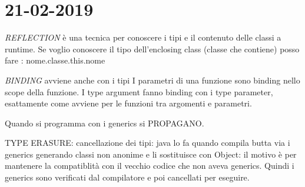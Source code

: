 

\newpage
\section{21-02-2019}
\par

\textit{REFLECTION} è una tecnica per conoscere i tipi e il contenuto delle classi  a runtime. \newline
Se voglio conoscere il tipo dell'enclosing class (classe che contiene) posso fare : nome.classe.this.nome \newline

\textit{BINDING} avviene anche con i tipi \newline
I parametri di una funzione sono binding nello scope della funzione.\newline
I type argument fanno binding con i type parameter, esattamente come avviene per le funzioni tra argomenti e parametri. \newline

Quando si programma con i generics si PROPAGANO. \newline

TYPE ERASURE: cancellazione dei tipi: java lo fa quando compila butta via i generics generando classi non anonime e li sostituisce con Object: il motivo è per mantenere la compatiblità con il vecchio codice che non aveva generics. Quindi i generics sono verificati dal compilatore e poi cancellati per eseguire.














